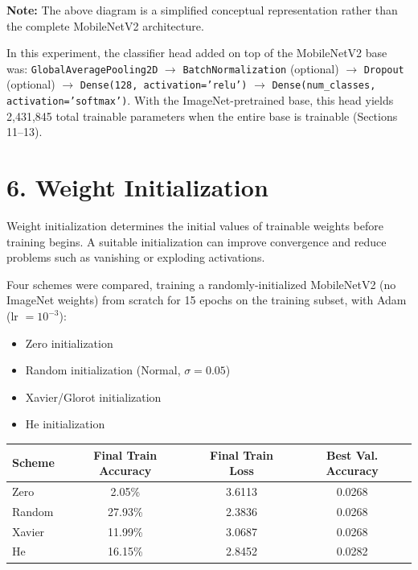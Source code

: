 \documentclass[10pt]{article}
\begin{document}
\textbf{Note:} The above diagram is a simplified conceptual representation
rather than the complete MobileNetV2 architecture.

In this experiment, the classifier head added on top of the MobileNetV2
base was: \texttt{GlobalAveragePooling2D} $\rightarrow$
\texttt{BatchNormalization} (optional) $\rightarrow$ \texttt{Dropout}
(optional) $\rightarrow$ \texttt{Dense(128, activation='relu')}
$\rightarrow$ \texttt{Dense(num\_classes, activation='softmax')}. With
the ImageNet-pretrained base, this head yields 2{,}431{,}845 total
trainable parameters when the entire base is trainable (Sections 11--13).

\section*{6. Weight Initialization}

Weight initialization determines the initial values of trainable weights
before training begins. A suitable initialization can improve convergence
and reduce problems such as vanishing or exploding activations.

Four schemes were compared, training a randomly-initialized MobileNetV2
(no ImageNet weights) from scratch for 15 epochs on the training subset,
with Adam (lr $=10^{-3}$):

\begin{itemize}
\item Zero initialization
\item Random initialization (Normal, $\sigma=0.05$)
\item Xavier/Glorot initialization
\item He initialization
\end{itemize}

\begin{center}
\begin{tabular}{|l|c|c|c|}
\hline
Scheme & Final Train Accuracy & Final Train Loss & Best Val. Accuracy\\
\hline
Zero   & 2.05\%  & 3.6113 & 0.0268\\
Random & 27.93\% & 2.3836 & 0.0268\\
Xavier & 11.99\% & 3.0687 & 0.0268\\
He     & 16.15\% & 2.8452 & 0.0282\\
\hline
\end{tabular}
\end{center}
\end{document}
